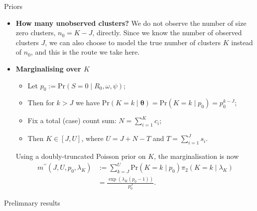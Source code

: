 \documentclass[final]{beamer}
\newcommand{\disp}{\omega}					%
\newcommand{\chain}{c}							%
\newcommand{\chains}{\mathbf{C}}		%
\newcommand{\ncases}{N}					    %
\newcommand{\seqrate}{\psi}					%
\newcommand{\seq}{s}								%
\newlength{\colwidth}
\begin{document}
\begin{frame}[t]
\begin{columns}[t]
\begin{column}{\colwidth}
\begin{block}{Priors}
  \begin{itemize}
   \item \textbf{How many unobserved clusters?}
We do not observe the number of size zero clusters, $n_0 = K - J$, directly.
Since we know the number of observed clusters $J$, we can also choose to model the true number of clusters $K$ instead of $n_0$, and this is the route we take here.
   \item\textbf{Marginalising over $K$}
   \begin{itemize}
    \item Let $p_0 := \text{Pr}( S = 0  \mid  R_0, \disp, \seqrate)$;
    \item Then for $k > J$ we have $\text{Pr}(K = k \mid  \boldsymbol\theta) = \text{Pr}(K = k \mid  p_0) = p_0^{k-J}$;
    \item Fix a total (case) count sum: $\ncases = \sum_{i = 1}^K \chain_i$;
    \item Then $K \in [J, U]$, where $U = J + \ncases -T$ and $T= \sum_{i= 1}^J \seq_i$.
   \end{itemize}
Using a doubly-truncated Poisson prior on $K$, the marginalisation is now
\begin{align}
\nonumber
m^{\prime\prime}(J, U, p_0, \lambda_K) &:= \sum_{k = J}^U \text{Pr}(K = k  \mid  p_0) \pi_2(K = k  \mid  \lambda_K) \\
\nonumber
\label{eq:pois_marg_K}
& = \frac{\exp(\lambda_K(p_0-1))}{p_0^J}.
\end{align}
\end{itemize}
\end{block}

\begin{block}{Prelimnary results}


\end{block}
\end{column}
\end{columns}
\end{frame}
\end{document}
